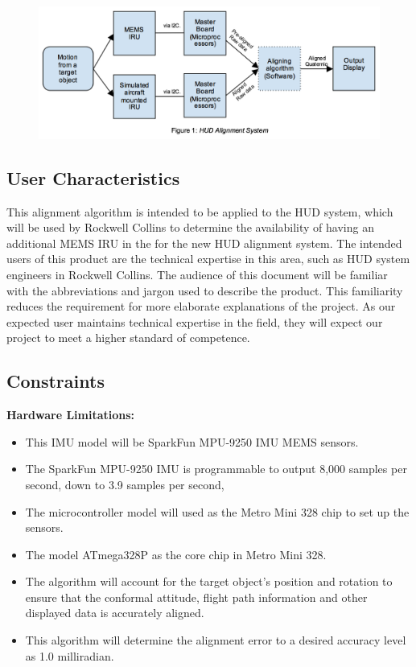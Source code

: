\begin{figure}[!ht]
  \centering
      \includegraphics{diagram}
\end{figure}


\subsection{User Characteristics}
This alignment algorithm is intended to be applied to the HUD system, which will be used by Rockwell Collins to determine the availability of having an additional MEMS IRU in the for the new HUD alignment system. The intended users of this product are the technical expertise in this area, such as HUD system engineers in Rockwell Collins. The audience of this document will be familiar with the abbreviations and jargon used to describe the product. This familiarity reduces the requirement for more elaborate explanations of the project. As our expected user maintains technical expertise in the field, they will expect our project to meet a higher standard of competence.


\subsection{Constraints}
\textbf{Hardware Limitations:} 
\begin{itemize}
	\item 
	This IMU model will be SparkFun MPU-9250 IMU MEMS sensors. 
	\item 
	The SparkFun MPU-9250 IMU is programmable to output 8,000 samples per second, down to 3.9 samples per second,
	\item 
	The microcontroller model will used as the Metro Mini 328 chip to set up the sensors.   
	\item 
	The model ATmega328P as the core chip in Metro Mini 328. 
	\item 
	The algorithm will account for the target object’s position and rotation to ensure that the conformal attitude, flight path information and other displayed data is accurately aligned.
	\item 
	This algorithm will determine the alignment error to a desired accuracy level as 1.0 milliradian.
	\\
\end{itemize}

